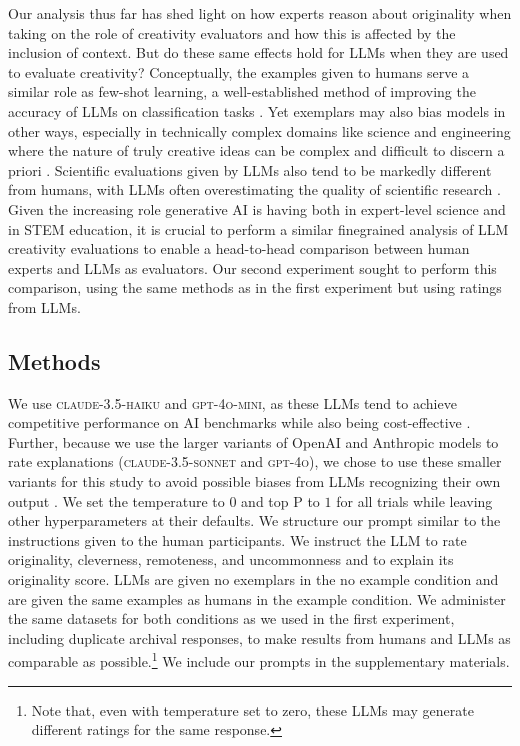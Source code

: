 Our analysis thus far has shed light on how experts reason about originality when taking on the role of creativity evaluators and how this is affected by the inclusion of context. But do these same effects hold for LLMs when they are used to evaluate creativity? Conceptually, the examples given to humans serve a similar role as few-shot learning, a well-established method of improving the accuracy of LLMs on classification tasks \citep{brown2020language}. Yet exemplars may also bias models in other ways, especially in technically complex domains like science and engineering where the nature of truly creative ideas can be complex and difficult to discern a priori \citep{schmidt2011creativity,simonton2004creativity}. Scientific evaluations given by LLMs also tend to be markedly different from humans, with LLMs often overestimating the quality of scientific research \citep{schmidgall2025agent}. Given the increasing role generative AI is having both in expert-level science and in STEM education, it is crucial to perform a similar finegrained analysis of LLM creativity evaluations to enable a head-to-head comparison between human experts and LLMs as evaluators. Our second experiment sought to perform this comparison, using the same methods as in the first experiment but using ratings from LLMs.


\subsection{Methods}
We use \textsc{claude-3.5-haiku} and \textsc{gpt-4o-mini}, as these LLMs tend to achieve competitive performance on AI benchmarks while also being cost-effective \citep{chiang2024chatbot}. Further, because we use the larger variants of OpenAI and Anthropic models to rate explanations (\textsc{claude-3.5-sonnet} and \textsc{gpt-4o}), we chose to use these smaller variants for this study to avoid possible biases from LLMs recognizing their own output \citep{panickssery2024llm}. We set the temperature to $0$ and top P to $1$ for all trials while leaving other hyperparameters at their defaults. We structure our prompt similar to the instructions given to the human participants. We instruct the LLM to rate originality, cleverness, remoteness, and uncommonness and to explain its originality score. LLMs are given no exemplars in the no example condition and are given the same examples as humans in the example condition. We administer the same datasets for both conditions as we used in the first experiment, including duplicate archival responses, to make results from humans and LLMs as comparable as possible.\footnote{Note that, even with temperature set to zero, these LLMs may generate different ratings for the same response.} We include our prompts in the supplementary materials.

